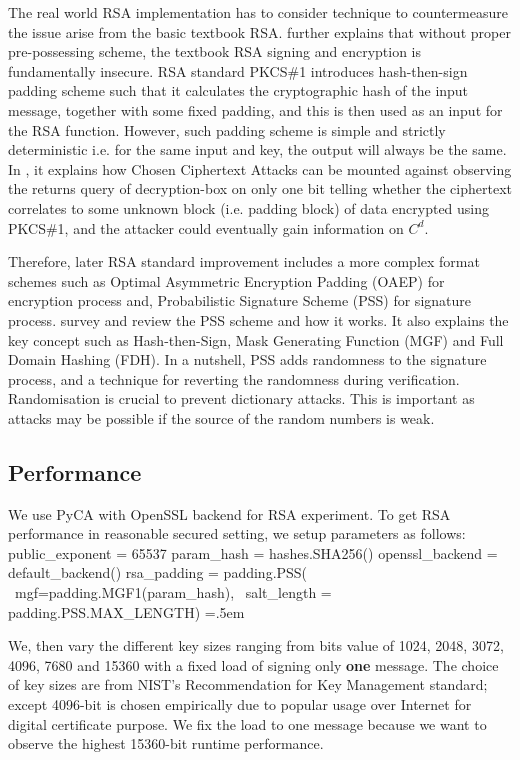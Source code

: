 \documentclass[10pt,sigconf]{acmart}
\newenvironment{lcverbatim}
 {\SaveVerbatim{cverb}}
 {\endSaveVerbatim
  \flushleft\fboxrule=0pt\fboxsep=.5em
  \colorbox{cverbbg}{%
    \makebox[\dimexpr\linewidth-2\fboxsep][l]{\BUseVerbatim{cverb}}%
  }
  \endflushleft
}
\begin{document}
The real world RSA implementation has to consider technique to countermeasure the issue arise from the basic textbook RSA. \cite{boneh2000textbook} further explains that without proper pre-possessing scheme, the textbook RSA signing and encryption is fundamentally insecure. RSA standard PKCS\#1 introduces hash-then-sign padding scheme such that it calculates the cryptographic hash of the input message, together with some fixed padding, and this is then used as an input for the RSA function. However, such padding scheme is simple and strictly deterministic i.e. for the same input and key, the output will always be the same. In \cite{bleichenbacher1998chosen}, it explains how Chosen Ciphertext Attacks can be mounted against observing the returns query of decryption-box on only one bit telling whether the ciphertext correlates to some unknown block (i.e. padding block) of data encrypted using PKCS\#1, and the attacker could eventually gain information on $C^d$.

Therefore, later RSA standard improvement includes a more complex format schemes such as Optimal Asymmetric Encryption Padding (OAEP) \cite{bellare1994optimal} for encryption process and, Probabilistic Signature Scheme (PSS) \cite{bellare2001probabilistic} for signature process. \cite{bock2011rsa} survey and review the PSS scheme and how it works. It also explains the key concept such as Hash-then-Sign, Mask Generating Function (MGF) and Full Domain Hashing (FDH). In a nutshell, PSS adds randomness to the signature process, and a technique for reverting the randomness during verification. Randomisation is crucial to prevent dictionary attacks. This is important as attacks may be possible if the source of the random numbers is weak.

\subsection{Performance}

We use PyCA \cite{PyCACryptography} with OpenSSL backend for RSA experiment. To get RSA performance in reasonable secured setting, we setup parameters as follows:
\small{
\begin{lcverbatim}
public_exponent = 65537
param_hash = hashes.SHA256()
openssl_backend = default_backend()
rsa_padding = padding.PSS( \
    mgf=padding.MGF1(param_hash), \
    salt_length = padding.PSS.MAX_LENGTH)
\end{lcverbatim}
}

We, then vary the different key sizes ranging from bits value of 1024, 2048, 3072, 4096, 7680 and 15360 with a fixed load of signing only \textbf{one} message. The choice of key sizes are from NIST's 
Recommendation for Key Management \cite{nistKeysizes} standard; except 4096-bit is chosen empirically due to popular usage over Internet for digital certificate purpose. We fix the load to one message because we want to observe the highest 15360-bit runtime performance.
\end{document}
